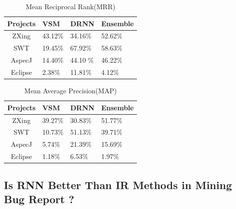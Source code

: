  \begin{table}[h]
 	\begin{center}
 		\caption{Mean Reciprocal Rank(MRR)}
 		\label{performance_MRR}
 		
 		\begin{tabular}{c|l|l|l} %
 			\textbf{Projects} & \textbf{VSM} & \textbf{DRNN} & \textbf{Ensemble} \\
 			\hline\hline
 			ZXing& 43.12\%&34.16\% &52.62\% \\
 			
 			SWT & 19.45\% & 67.92\% & 58.63\% \\
 			
 			AspecJ &14.40\%  & 44.10 \% & 46.22\%\\
 			
 			Eclipse &2.38\% & 11.81\%& 4.12\% \\
 			
 		\end{tabular}
 	\end{center}
 \end{table}




 \begin{table}[h]
 	\begin{center}
 		\caption{Mean Average Precision(MAP)}
 		\label{performance_map}
 		
 		\begin{tabular}{c|l|l|l} %
 			\textbf{Projects} & \textbf{VSM} & \textbf{DRNN} & \textbf{Ensemble} \\
 			\hline\hline
 			ZXing& 39.27\%&30.83\% &51.77\%\\
 			
 			SWT & 10.73\%  & 51.13\%  & 39.71\% \\
 			
 			AspecJ &5.74\% & 21.39\% & 15.69\%\\
 			
 			Eclipse &1.18\% & 6.53\%& 1.97\% \\
 			
 		\end{tabular}
 	\end{center}
 \end{table}


\subsection{Is RNN Better Than IR Methods in Mining Bug Report ?}









	 
